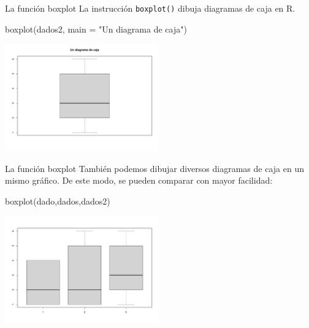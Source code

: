 \documentclass[
  ignorenonframetext,
  aspectratio=169]{beamer}
\newenvironment{Shaded}{\begin{snugshade}}{\end{snugshade}}
\newcommand{\AttributeTok}[1]{\textcolor[rgb]{0.77,0.63,0.00}{#1}}
\newcommand{\FunctionTok}[1]{\textcolor[rgb]{0.00,0.00,0.00}{#1}}
\newcommand{\NormalTok}[1]{#1}
\newcommand{\StringTok}[1]{\textcolor[rgb]{0.31,0.60,0.02}{#1}}
\begin{document}
\begin{frame}[fragile]{La función boxplot}
\protect\hypertarget{la-funciuxf3n-boxplot}{}
La instrucción \texttt{boxplot()} dibuja diagramas de caja en R.

\begin{Shaded}
\begin{Highlighting}[]
\FunctionTok{boxplot}\NormalTok{(dados2, }\AttributeTok{main =} \StringTok{"Un diagrama de caja"}\NormalTok{)}
\end{Highlighting}
\end{Shaded}

\begin{center}\includegraphics[width=250px]{Hora5_files/figure-beamer/unnamed-chunk-10-1} \end{center}
\end{frame}

\begin{frame}[fragile]{La función boxplot}
\protect\hypertarget{la-funciuxf3n-boxplot-1}{}
También podemos dibujar diversos diagramas de caja en un mismo gráfico.
De este modo, se pueden comparar con mayor facilidad:

\begin{Shaded}
\begin{Highlighting}[]
\FunctionTok{boxplot}\NormalTok{(dado,dados,dados2)}
\end{Highlighting}
\end{Shaded}

\begin{center}\includegraphics[width=250px]{Hora5_files/figure-beamer/unnamed-chunk-11-1} \end{center}
\end{frame}
\end{document}
